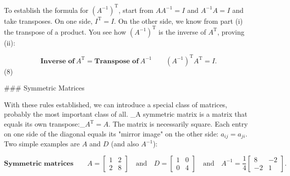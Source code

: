 To establish the formula for \((A^{-1})^{\mathrm{T}}\), start from \(AA^{-1}=I\) and \(A^{-1}A=I\) and take transposes. On one side, \(I^{\mathrm{T}}=I\). On the other side, we know from part (i) the transpose of a product. You see how \((A^{-1})^{\mathrm{T}}\) is the inverse of \(A^{\mathrm{T}}\), proving (ii):

\[\textbf{Inverse of}\ A^{\mathrm{T}}=\textbf{Transpose of}\ A^{-1}\qquad(A^{-1})^{ \mathrm{T}}A^{\mathrm{T}}=I.\] (8)

### Symmetric Matrices

With these rules established, we can introduce a special class of matrices, probably the most important class of all. _A symmetric matrix is a matrix that equals its own transpose:_\(A^{\mathrm{T}}=A\). The matrix is necessarily square. Each entry on one side of the diagonal equals its "mirror image" on the other side: \(a_{ij}=a_{ji}\). Two simple examples are \(A\) and \(D\) (and also \(A^{-1}\)):

\[\textbf{Symmetric matrices}\qquad A=\begin{bmatrix}1&2\\ 2&8\end{bmatrix}\quad\text{and}\quad D=\begin{bmatrix}1&0\\ 0&4\end{bmatrix}\quad\text{and}\quad A^{-1}=\frac{1}{4}\begin{bmatrix}8&-2\\ -2&1\end{bmatrix}.\] 